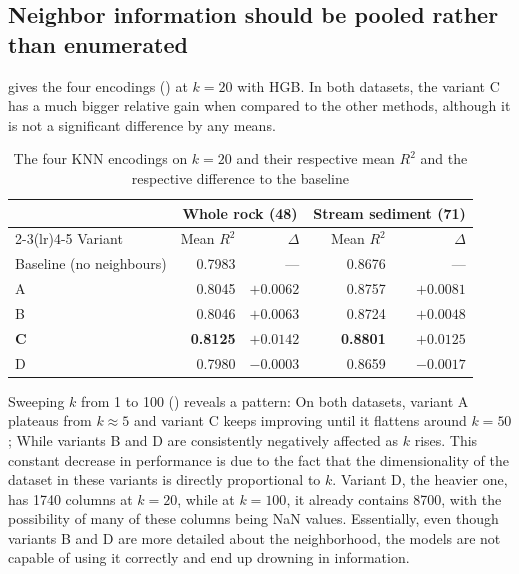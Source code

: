 \documentclass[
    a4paper,
    11pt,
    oneside,
    numbers=noendperiod,
    abstract=true
]{scrartcl}
\newcommand{\Rsq}{$R^2$}
\begin{document}
\subsection{Neighbor information should be pooled rather than enumerated}
\label{sec:variants}



 gives the four encodings () at $k=20$ with HGB. In both datasets, the variant C has a much bigger relative gain when compared to the other methods, although it is not a significant difference by any means. 

\begin{table}[htbp]
\centering
\caption[Neighbour encodings on both datasets]{The four KNN encodings on $k=20$ and their respective mean \Rsq{} and the respective difference to the baseline}
\label{tab:variants}
\begin{tabular}{lrrrr}
\toprule
 & \multicolumn{2}{c}{Whole rock (48)} & \multicolumn{2}{c}{Stream sediment (71)} \\
\cmidrule(lr){2-3}\cmidrule(lr){4-5}
Variant & Mean \Rsq{} & $\Delta$ & Mean \Rsq{} & $\Delta$ \\
\midrule
Baseline (no neighbours) & \num{0.7983} & ---            & \num{0.8676} & --- \\
A                        & \num{0.8045} & $+0.0062$      & \num{0.8757} & $+0.0081$ \\
B                        & \num{0.8046} & $+0.0063$      & \num{0.8724} & $+0.0048$ \\
\textbf{C}               & \textbf{\num{0.8125}} & $\mathbf{+0.0142}$ & \textbf{\num{0.8801}} & $\mathbf{+0.0125}$ \\
D                        & \num{0.7980} & $-0.0003$      & \num{0.8659} & $-0.0017$ \\
\bottomrule
\end{tabular}
\end{table}


Sweeping $k$ from 1 to 100 () reveals a pattern: On both datasets, variant A plateaus from $k \approx 5$ and variant C keeps improving until it flattens around $k = 50$; While variants B and D are consistently negatively affected as $k$ rises. This constant decrease in performance is due to the fact that the dimensionality of the dataset in these variants is directly proportional to $k$. Variant D, the heavier one, has \num{1740} columns at $k=20$, while at $k=100$, it already contains \num{8700}, with the possibility of many of these columns being NaN values. Essentially, even though variants B and D are more detailed about the neighborhood, the models are not capable of using it correctly and end up drowning in information. 
\end{document}
